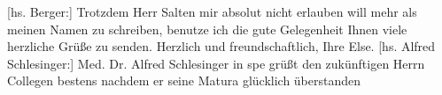 \begin{ledgroupsized}[t]{13cm}
           \pstart
           {[}hs. Berger:{]} Trotzdem Herr Salten mir absolut nicht erlauben \introOben{}will\introOben{} mehr als meinen Namen zu schreiben, benutze ich die gute
               Gelegenheit Ihnen viele herzliche Grüße zu senden. Herzlich und freundschaftlich,
               Ihre \spacefill\mbox{Else.}\pend
           \pstart
           {[}hs. Alfred Schlesinger:{]} Med. Dr. Alfred Schlesinger \introOben{}in
                  spe\introOben{} grüßt den zukünftigen Herrn Collegen bestens nachdem er seine Matura
               glücklich überstanden\pend
           \pstart
           \noindent{}\label{T_L03177-1v}\label{T_L03177-1h}\pend
           
         
         \endnumbering{}\end{ledgroupsized}  \newcommand{\dateiname}{L03177}\newcommand{\titel}{Felix Salten u. a. an Arthur Schnitzler, 6. 8. 1896}\newcommand{\editorInnen}{Martin Anton Müller und Laura Untner}
      